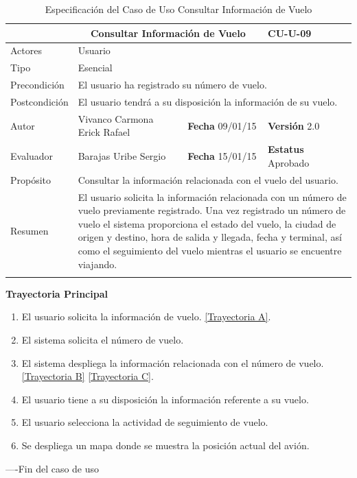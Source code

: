 \begin{longtable}{|p{2.5cm}|p{6.4cm}|p{2cm}|p{2cm}|}
	\hline
		\rowcolor[RGB]{51,153,255}{Caso de Uso}&\multicolumn{2}{c}{Consultar Información de Vuelo}&{\textbf{CU-U-09}}\\
	\hline
		{Actores}&\multicolumn{3}{p{11.2cm}|}{Usuario}\\
	\hline
		{Tipo}&\multicolumn{3}{p{11.2cm}|}{Esencial}\\
	\hline
		{Precondición}&\multicolumn{3}{p{11.2cm}|}{	El usuario ha registrado su número de vuelo.}\\
	\hline
		{Postcondición}&\multicolumn{3}{p{11.2cm}|}{El usuario tendrá a su disposición la información de su vuelo.}\\
	\hline
		{Autor}&{Vivanco Carmona Erick Rafael}&{\textbf{Fecha} 09/01/15}&{\textbf{Versión} 2.0}\\
			\hline
		{Evaluador}&{Barajas Uribe Sergio}&{\textbf{Fecha} 15/01/15}&{\textbf{Estatus} Aprobado}\\
	\hline
		{Propósito}&\multicolumn{3}{p{11.2cm}|}{Consultar la información relacionada con el vuelo del usuario.}\\
	\hline
		{Resumen}&\multicolumn{3}{p{11.2cm}|}{El usuario solicita la información relacionada con un número de vuelo previamente registrado. Una vez registrado un número de vuelo el sistema proporciona el estado del vuelo, la ciudad de origen y destino, hora de salida y llegada, fecha y terminal, así como el seguimiento del vuelo mientras el usuario se encuentre viajando.}\\	
	\hline
	\caption[Especificación del Caso de Uso Consultar Información de Vuelo]{Especificación del Caso de Uso Consultar Información de Vuelo}
    	\label{tab:cuConsultarInformacionVuelo}
\end{longtable}

\begin{flushleft}
	\textbf{Trayectoria Principal}\\
	\begin{enumerate}
		\item El usuario solicita la información de vuelo. \hyperlink{TrayectoriaA_CU-U-09}{[Trayectoria A]}.
		\item El sistema solicita el número de vuelo.
		\item El sistema despliega la información relacionada con el número de vuelo. \hyperlink{TrayectoriaB_CU-U-09}{[Trayectoria B]} \hyperlink{TrayectoriaC_CU-U-09}{[Trayectoria C]}.
		\item El usuario tiene a su disposición la información referente a su vuelo.
		\item El usuario selecciona la actividad de seguimiento de vuelo.
		\item	Se despliega un mapa donde se muestra la posición actual del avión.
	\end{enumerate}
\end{flushleft}
----Fin del caso de uso

